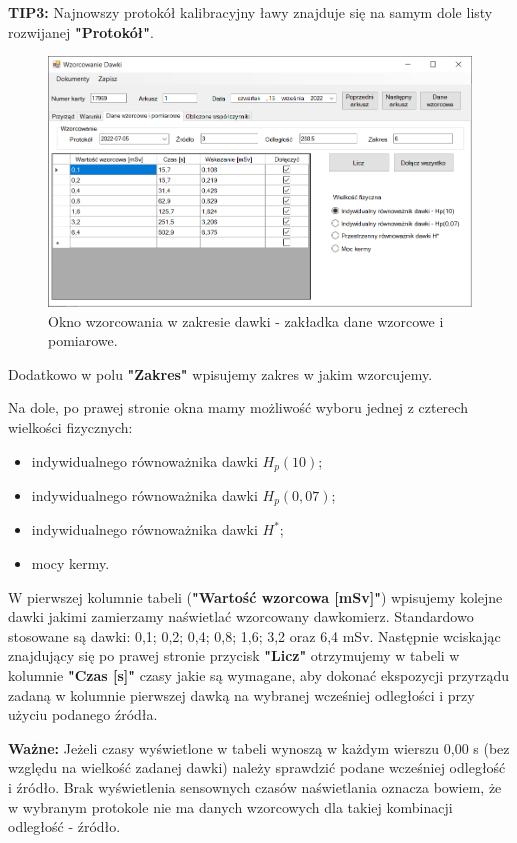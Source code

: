 \textbf{TIP3:} Najnowszy protokół kalibracyjny ławy znajduje się na samym dole listy rozwijanej \textbf{"Protokół"}.

\begin{figure}[htb]
	\centering
	\includegraphics[width=\columnwidth]{obrazki/Wzorcowanie/dawka/dane.png}
	\caption{Okno wzorcowania w zakresie dawki - zakładka dane wzorcowe i pomiarowe.}
	\label{dawkaDane}
\end{figure}

Dodatkowo w polu \textbf{"Zakres"} wpisujemy zakres w jakim wzorcujemy. 

Na dole, po prawej stronie okna mamy możliwość wyboru jednej z czterech wielkości fizycznych:
\begin{itemize}
	\item indywidualnego równoważnika dawki $H_{p}(10)$;
	\item indywidualnego równoważnika dawki $H_{p}(0,07)$;
	\item indywidualnego równoważnika dawki $H^{*}$;
	\item mocy kermy.
\end{itemize}

W pierwszej kolumnie tabeli (\textbf{"Wartość wzorcowa [mSv]"}) wpisujemy kolejne dawki jakimi zamierzamy naświetlać wzorcowany dawkomierz. Standardowo stosowane są dawki: 0,1; 0,2; 0,4; 0,8; 1,6; 3,2 oraz 6,4 mSv. Następnie wciskając znajdujący się po prawej stronie przycisk \textbf{"Licz"} otrzymujemy w tabeli w kolumnie \textbf{"Czas [s]"} czasy jakie są wymagane, aby dokonać ekspozycji przyrządu zadaną w kolumnie pierwszej dawką na wybranej wcześniej odległości i przy użyciu podanego źródła.

\textbf{Ważne:} Jeżeli czasy wyświetlone w tabeli wynoszą w każdym wierszu 0,00 s (bez względu na wielkość zadanej dawki) należy sprawdzić podane wcześniej odległość i źródło. Brak wyświetlenia sensownych czasów naświetlania oznacza bowiem, że w wybranym protokole nie ma danych wzorcowych dla takiej kombinacji odległość - źródło.

